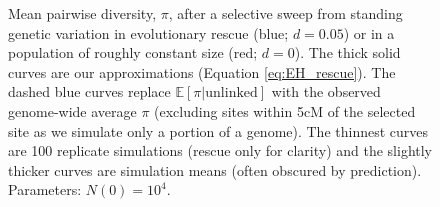 \documentclass[]{article}
\begin{document}
\begin{figure}[htbp]
\caption{
Mean pairwise diversity, $\pi$, after a selective sweep from standing genetic variation in evolutionary rescue (blue; $d=0.05$) or in a population of roughly constant size (red; $d=0$).
The thick solid curves are our approximations (Equation \ref{eq:EH_rescue}).
The dashed blue curves replace $\mathbb{E}[\pi | \mathrm{unlinked}]$ with the observed genome-wide average $\pi$ (excluding sites within 5cM of the selected site as we simulate only a portion of a genome).
The thinnest curves are 100 replicate simulations (rescue only for clarity) and the slightly thicker curves are simulation means (often obscured by prediction).
Parameters: $N(0)=10^4$.
}%
\label{fig:rescueSGV_heterozygosity_empirical}
\end{figure}
\end{document}
